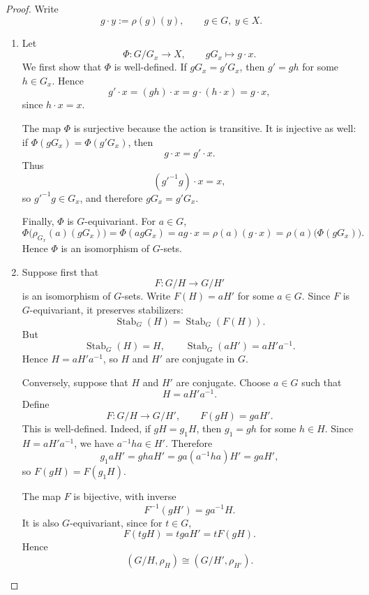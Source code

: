 \begin{proof}
    Write
    \[
        g\cdot y:=\rho(g)(y),
        \qquad g\in G,\ y\in X.
    \]
    \begin{enumerate}
        \item[(i)] Let
        \[
            \Phi:G/G_x\longrightarrow X,
            \qquad
            gG_x\longmapsto g\cdot x.
        \]
        We first show that \(\Phi\) is well-defined. If \(gG_x=g'G_x\), then
        \(g'=gh\) for some \(h\in G_x\). Hence
        \[
            g'\cdot x=(gh)\cdot x=g\cdot(h\cdot x)=g\cdot x,
        \]
        since \(h\cdot x=x\).

        The map \(\Phi\) is surjective because the action is transitive. It is
        injective as well: if \(\Phi(gG_x)=\Phi(g'G_x)\), then
        \[
            g\cdot x=g'\cdot x.
        \]
        Thus
        \[
            (g'^{-1}g)\cdot x=x,
        \]
        so \(g'^{-1}g\in G_x\), and therefore \(gG_x=g'G_x\).

        Finally, \(\Phi\) is \(G\)-equivariant. For \(a\in G\),
        \[
            \Phi\bigl(\rho_{G_x}(a)(gG_x)\bigr)
            =
            \Phi(agG_x)
            =
            ag\cdot x
            =
            \rho(a)(g\cdot x)
            =
            \rho(a)\bigl(\Phi(gG_x)\bigr).
        \]
        Hence \(\Phi\) is an isomorphism of \(G\)-sets.

        \item[(ii)] Suppose first that
        \[
            F:G/H\longrightarrow G/H'
        \]
        is an isomorphism of \(G\)-sets. Write \(F(H)=aH'\) for some
        \(a\in G\). Since \(F\) is \(G\)-equivariant, it preserves stabilizers:
        \[
            \operatorname{Stab}_G(H)=\operatorname{Stab}_G(F(H)).
        \]
        But
        \[
            \operatorname{Stab}_G(H)=H,
            \qquad
            \operatorname{Stab}_G(aH')=aH'a^{-1}.
        \]
        Hence \(H=aH'a^{-1}\), so \(H\) and \(H'\) are conjugate in \(G\).

        Conversely, suppose that \(H\) and \(H'\) are conjugate. Choose
        \(a\in G\) such that
        \[
            H=aH'a^{-1}.
        \]
        Define
        \[
            F:G/H\longrightarrow G/H',
            \qquad
            F(gH)=gaH'.
        \]
        This is well-defined. Indeed, if \(gH=g_1H\), then \(g_1=gh\) for
        some \(h\in H\). Since \(H=aH'a^{-1}\), we have \(a^{-1}ha\in H'\).
        Therefore
        \[
            g_1aH'=ghaH'=ga(a^{-1}ha)H'=gaH',
        \]
        so \(F(gH)=F(g_1H)\).

        The map \(F\) is bijective, with inverse
        \[
            F^{-1}(gH')=ga^{-1}H.
        \]
        It is also \(G\)-equivariant, since for \(t\in G\),
        \[
            F(tgH)=tgaH'=tF(gH).
        \]
        Hence
        \[
            (G/H,\rho_H)\cong (G/H',\rho_{H'}).
        \]
    \end{enumerate}
\end{proof}



